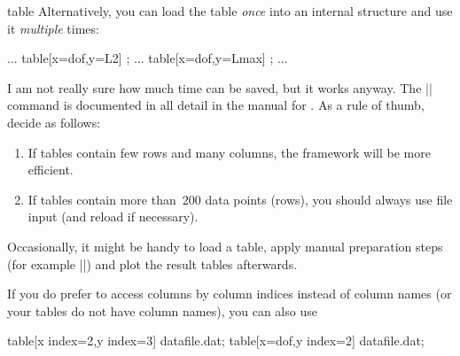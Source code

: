 {\begin{addplotoperation}[]{table}{}
Alternatively, you can load the table \emph{once} into an internal structure and use it \emph{multiple} times:
\begin{codeexample}
\loadedtable %
...
\addplot table[x=dof,y=L2] {\loadedtable};
...
\addplot table[x=dof,y=Lmax] {\loadedtable};
...
\end{codeexample}
I am not really sure how much time can be saved, but it works anyway. The |\pgfplotstableread| command is documented in all detail in the manual for \PGFPlotstable. As a rule of thumb, decide as follows:
\begin{enumerate}
	\item If tables contain few rows and many columns, the  framework will be more efficient.
	\item If tables contain more than~$200$ data points (rows), you should always use file input (and reload if necessary).
\end{enumerate}
Occasionally, it might be handy to load a table, apply manual preparation steps (for example |\pgfplotstabletranspose|) and plot the result tables afterwards.

If you do prefer to access columns by column indices instead of column names (or your tables do not have column names), you can also use
\begin{codeexample}
\addplot table[x index=2,y index=3] {datafile.dat};
\addplot table[x=dof,y index=2] {datafile.dat};
\end{codeexample}


\end{addplotoperation}}
